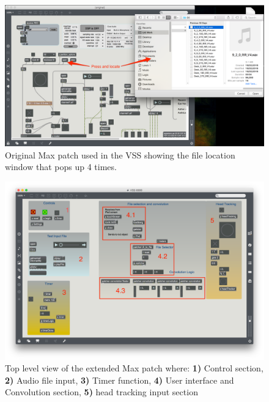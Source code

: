 \documentclass[../../main.tex]{subfiles}
\begin{document}
				\begin{figure}[h]
					\centerline{\includegraphics[width=\textwidth]{Sections/Implementation/Max/images/Max/OriginalPatch_Edit.png}}
					\caption{Original Max patch used in the \ac{VSS} showing the file location window that pops up 4 times.}
					\label{original}
				\end{figure}

				\begin{figure}[h]
					\centerline{\includegraphics[scale = 0.35]{Sections/Implementation/Max/images/Max/MyPatch_Edit.png}}
					\caption{Top level view of the extended Max patch where: \textbf{1)} Control section, \textbf{2)} Audio file input, \textbf{3)} Timer function, \textbf{4)} User interface and Convolution section, \textbf{5)} head tracking input section}
					\label{myPatch}
				\end{figure}
\end{document}
